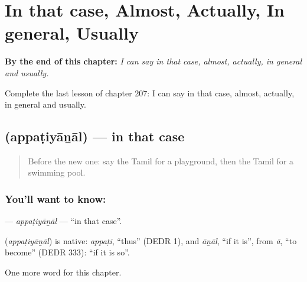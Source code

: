 
\chapter{In that case, Almost, Actually, In general, Usually}
\label{ch:ta-in-that-case-almost-actually-in-general-usually}

\begin{chapteropening}
\textbf{By the end of this chapter:} \emph{I can say in that case, almost, actually, in general and usually.}

Complete the last lesson of chapter 207: I can say in that case, almost, actually, in general and usually.
\end{chapteropening}

\section[\texorpdfstring{\ta{அப்படியானால்} (appaṭiyāṉāl)}{அப்படியானால் (appaṭiyāṉāl)}]{ (appaṭiyāṉāl) — in that case}

\label{lesson:TA-C207-appatiyanal}



\begin{quote}
Before the new one: say the Tamil for a playground, then the Tamil for a swimming pool.
\end{quote}

\subsection*{You'll want to know: }
\textbf{} — \emph{appaṭiyāṉāl} — \textquotedblleft{}in that case\textquotedblright{}.

\begin{cousinweb}
\textbf{} (\emph{appaṭiyāṉāl}) is native: \emph{appaṭi}, \textquotedblleft{}thus\textquotedblright{} (DEDR 1), and \emph{āṉāl}, \textquotedblleft{}if it is\textquotedblright{}, from \emph{ā}, \textquotedblleft{}to become\textquotedblright{} (DEDR 333): \textquotedblleft{}if it is so\textquotedblright{}.
\end{cousinweb}

\begin{grammarlens}[title={What you've built}]
One more word for this chapter.
\end{grammarlens}

